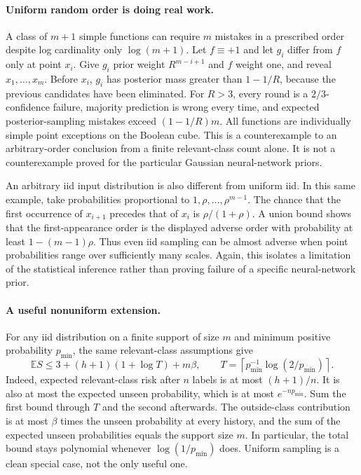 \documentclass[11pt]{article}
\theoremstyle{remark}\newtheorem{remark}[theorem]{Remark}
\newcommand{\E}{\mathbb E}\newcommand{\Pp}{\mathbb P}
\begin{document}
\paragraph{Uniform random order is doing real work.}
A class of $m+1$ simple functions can require $m$ mistakes in a prescribed
order despite log cardinality only $\log(m+1)$. Let $f\equiv+1$ and let
$g_i$ differ from $f$ only at point $x_i$. Give $g_i$ prior weight
$R^{m-i+1}$ and $f$ weight one, and reveal $x_1,\ldots,x_m$.
Before $x_i$, $g_i$ has posterior mass greater than $1-1/R$, because the
previous candidates have been eliminated. For $R>3$, every round is a
$2/3$-confidence failure, majority prediction is wrong every time, and
expected posterior-sampling mistakes exceed $(1-1/R)m$.
All functions are individually simple point exceptions on the Boolean
cube. This is a counterexample to an arbitrary-order conclusion from a
finite relevant-class count alone. It is not a counterexample proved for
the particular Gaussian neural-network priors.

An arbitrary iid input distribution is also different from uniform iid.
In this same example, take probabilities proportional to
$1,\rho,\ldots,\rho^{m-1}$. The chance that the first occurrence of
$x_{i+1}$ precedes that of $x_i$ is $\rho/(1+\rho)$. A union bound shows
that the first-appearance order is the displayed adverse order with
probability at least $1-(m-1)\rho$. Thus even iid sampling can be almost
adverse when point probabilities range over sufficiently many scales.
Again, this isolates a limitation of the statistical inference rather than
proving failure of a specific neural-network prior.

\paragraph{A useful nonuniform extension.}
For any iid distribution on a finite support of size $m$ and minimum
positive probability $p_{\min}$, the same relevant-class assumptions give
\[
 \E S\le 3+(h+1)(1+\log T)+m\beta,
 \qquad T=\left\lceil p_{\min}^{-1}\log(2/p_{\min})\right\rceil.
\]
Indeed, expected relevant-class risk after $n$ labels is at most
$(h+1)/n$. It is also at most the expected unseen probability, which is
at most $e^{-np_{\min}}$. Sum the first bound through $T$ and the second
afterwards. The outside-class contribution is at most $\beta$ times the
unseen probability at every history, and the sum of the expected unseen
probabilities equals the support size $m$. In particular, the total bound
stays polynomial whenever $\log(1/p_{\min})$ does. Uniform sampling is a
clean special case, not the only useful one.
\end{document}
